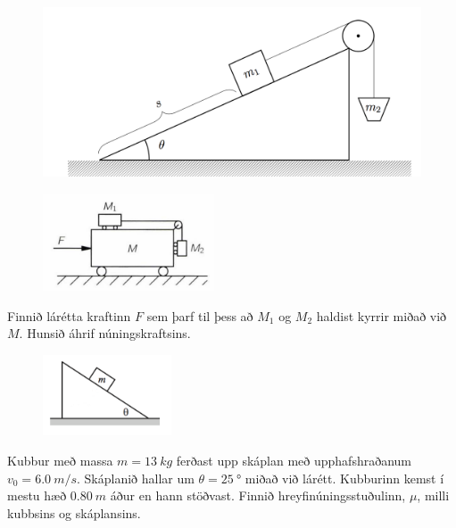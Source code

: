\ifdefined \wholebook \else\documentclass[oneside]{book}\usepackage{EdlBook}\graphicspath{{figures/}}
\begin{document}
\begin{enumerate}[label = \textbf{Dæmi \thechapter.\arabic*.}]
\begin{figure}[H]
    \centering
    \includegraphics[scale = 0.5]{images/vatnsfata.png}
\end{figure}

\begin{minipage}{\linewidth}
\begin{figure}
\vspace{-0.5cm}
\includegraphics[width=2in]{images/feyn.png}
\end{figure}


\item Finnið lárétta kraftinn $F$ sem þarf til þess að $M_1$ og $M_2$ haldist kyrrir miðað við $M$. Hunsið áhrif núningskraftsins.

\end{minipage}

\newpage

\begin{minipage}{\linewidth}
\begin{figure}
\vspace{-1cm}
\includegraphics[width=1.5in]{images/skasson.png}
\end{figure}

\item Kubbur með massa $m = \SI{13}{kg}$ ferðast upp skáplan með upphafshraðanum $v_0 = \SI{6.0}{m/s}$. Skáplanið hallar um $\theta = \SI{25}{\degree}$ miðað við lárétt. Kubburinn kemst í mestu hæð $\SI{0,80}{m}$ áður en hann stöðvast. Finnið hreyfinúningsstuðulinn, $\mu$, milli kubbsins og skáplansins.
\end{minipage}


\end{enumerate}
\end{document}
